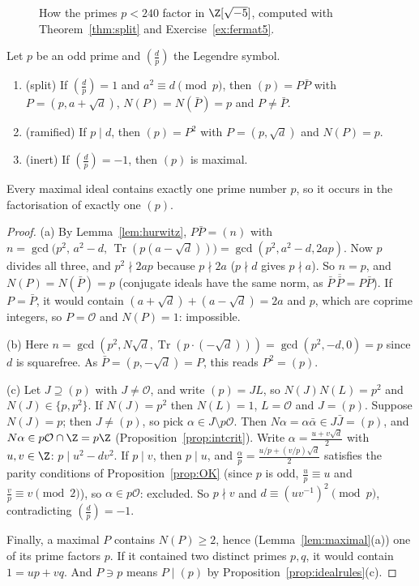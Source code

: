 \begin{figure}[ht]
\centering
{}
\caption{How the primes $p<240$ factor in $\Z[\sqrt{-5}]$, computed with Theorem~\ref{thm:split} and Exercise~\ref{ex:fermat5}.}
\label{fig:split}
\end{figure}

\begin{theorem}\label{thm:split}
Let $p$ be an odd prime and $\left(\frac dp\right)$ the Legendre symbol.
\begin{enumerate}[label=(\alph*)]
\item (split) If $\left(\frac dp\right)=1$ and $a^2\equiv d\pmod p$, then $(p)=P\bar P$ with $P=(p,a+\sqrt d)$, $N(P)=N(\bar P)=p$ and $P\ne\bar P$.
\item (ramified) If $p\mid d$, then $(p)=P^2$ with $P=(p,\sqrt d)$ and $N(P)=p$.
\item (inert) If $\left(\frac dp\right)=-1$, then $(p)$ is maximal.
\end{enumerate}
Every maximal ideal contains exactly one prime number $p$, so it occurs in the factorisation of exactly one $(p)$.
\end{theorem}
\begin{proof}
(a) By Lemma~\ref{lem:hurwitz}, $P\bar P=(n)$ with $n=\gcd\big(p^2,\,a^2-d,\,\operatorname{Tr}(p(a-\sqrt d))\big)=\gcd(p^2,a^2-d,2ap)$. Now $p$ divides all three, and $p^2\nmid2ap$ because $p\nmid2a$ ($p\nmid d$ gives $p\nmid a$). So $n=p$, and $N(P)=N(\bar P)=p$ (conjugate ideals have the same norm, as $\bar P\,\overline{\bar P}=P\bar P$). If $P=\bar P$, it would contain $(a+\sqrt d)+(a-\sqrt d)=2a$ and $p$, which are coprime integers, so $P=\mathcal O$ and $N(P)=1$: impossible.

(b) Here $n=\gcd(p^2,N\sqrt d,\operatorname{Tr}(p\cdot(-\sqrt d)))=\gcd(p^2,-d,0)=p$ since $d$ is squarefree. As $\bar P=(p,-\sqrt d)=P$, this reads $P^2=(p)$.

(c) Let $J\supseteq(p)$ with $J\ne\mathcal O$, and write $(p)=JL$, so $N(J)N(L)=p^2$ and $N(J)\in\{p,p^2\}$. If $N(J)=p^2$ then $N(L)=1$, $L=\mathcal O$ and $J=(p)$. Suppose $N(J)=p$; then $J\ne(p)$, so pick $\alpha\in J\setminus p\mathcal O$. Then $N\alpha=\alpha\bar\alpha\in J\bar J=(p)$, and $N\alpha\in p\mathcal O\cap\Z=p\Z$ (Proposition~\ref{prop:intcrit}). Write $\alpha=\frac{u+v\sqrt d}2$ with $u,v\in\Z$: $p\mid u^2-dv^2$. If $p\mid v$, then $p\mid u$, and $\frac\alpha p=\frac{u/p+(v/p)\sqrt d}2$ satisfies the parity conditions of Proposition~\ref{prop:OK} (since $p$ is odd, $\frac up\equiv u$ and $\frac vp\equiv v\pmod2$), so $\alpha\in p\mathcal O$: excluded. So $p\nmid v$ and $d\equiv(uv^{-1})^2\pmod p$, contradicting $\left(\frac dp\right)=-1$.

Finally, a maximal $P$ contains $N(P)\ge2$, hence (Lemma~\ref{lem:maximal}(a)) one of its prime factors $p$. If it contained two distinct primes $p,q$, it would contain $1=up+vq$. And $P\ni p$ means $P\mid(p)$ by Proposition~\ref{prop:idealrules}(c).
\end{proof}

